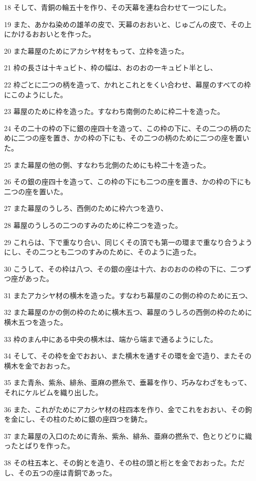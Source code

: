 \par 18 そして、青銅の輪五十を作り、その天幕を連ね合わせて一つにした。
\par 19 また、あかね染めの雄羊の皮で、天幕のおおいと、じゅごんの皮で、その上にかけるおおいとを作った。
\par 20 また幕屋のためにアカシヤ材をもって、立枠を造った。
\par 21 枠の長さは十キュビト、枠の幅は、おのおの一キュビト半とし、
\par 22 枠ごとに二つの柄を造って、かれとこれとをくい合わせ、幕屋のすべての枠にこのようにした。
\par 23 幕屋のために枠を造った。すなわち南側のために枠二十を造った。
\par 24 その二十の枠の下に銀の座四十を造って、この枠の下に、その二つの柄のために二つの座を置き、かの枠の下にも、その二つの柄のために二つの座を置いた。
\par 25 また幕屋の他の側、すなわち北側のためにも枠二十を造った。
\par 26 その銀の座四十を造って、この枠の下にも二つの座を置き、かの枠の下にも二つの座を置いた。
\par 27 また幕屋のうしろ、西側のために枠六つを造り、
\par 28 幕屋のうしろの二つのすみのために枠二つを造った。
\par 29 これらは、下で重なり合い、同じくその頂でも第一の環まで重なり合うようにし、その二つとも二つのすみのために、そのように造った。
\par 30 こうして、その枠は八つ、その銀の座は十六、おのおのの枠の下に、二つずつ座があった。
\par 31 またアカシヤ材の横木を造った。すなわち幕屋のこの側の枠のために五つ、
\par 32 また幕屋のかの側の枠のために横木五つ、幕屋のうしろの西側の枠のために横木五つを造った。
\par 33 枠のまん中にある中央の横木は、端から端まで通るようにした。
\par 34 そして、その枠を金でおおい、また横木を通すその環を金で造り、またその横木を金でおおった。
\par 35 また青糸、紫糸、緋糸、亜麻の撚糸で、垂幕を作り、巧みなわざをもって、それにケルビムを織り出した。
\par 36 また、これがためにアカシヤ材の柱四本を作り、金でこれをおおい、その鉤を金にし、その柱のために銀の座四つを鋳た。
\par 37 また幕屋の入口のために青糸、紫糸、緋糸、亜麻の撚糸で、色とりどりに織ったとばりを作った。
\par 38 その柱五本と、その鉤とを造り、その柱の頭と桁とを金でおおった。ただし、その五つの座は青銅であった。

